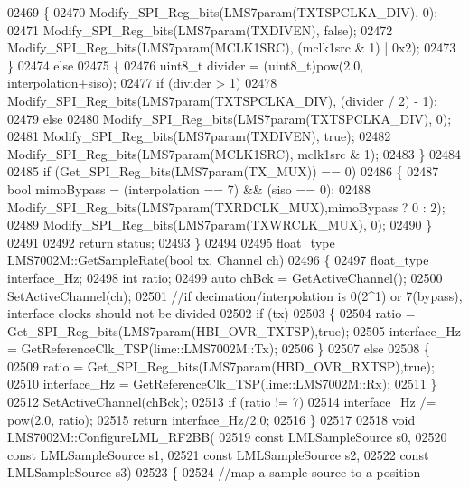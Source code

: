 \begin{DoxyCode}
{{{{{{{{{{{{{{{{{{{{{{{{{{{{{{{{{{{{{{{{{{{{{{{{{{{{{{{{{{{{{{{{02469     \{
02470         Modify_SPI_Reg_bits(LMS7param(TXTSPCLKA_DIV), 0);
02471         Modify_SPI_Reg_bits(LMS7param(TXDIVEN), \textcolor{keyword}{false});
02472         Modify_SPI_Reg_bits(LMS7param(MCLK1SRC), (mclk1src & 1) | 0x2);
02473     \}
02474     \textcolor{keywordflow}{else}
02475     \{
02476         uint8\_t divider = (uint8\_t)pow(2.0, interpolation+siso);
02477         \textcolor{keywordflow}{if} (divider > 1)
02478             Modify_SPI_Reg_bits(LMS7param(TXTSPCLKA_DIV), (divider / 2) - 1);
02479         \textcolor{keywordflow}{else}
02480             Modify_SPI_Reg_bits(LMS7param(TXTSPCLKA_DIV), 0);
02481         Modify_SPI_Reg_bits(LMS7param(TXDIVEN), \textcolor{keyword}{true});
02482         Modify_SPI_Reg_bits(LMS7param(MCLK1SRC), mclk1src & 1);
02483     \}
02484 
02485     \textcolor{keywordflow}{if} (Get_SPI_Reg_bits(LMS7param(TX_MUX)) == 0)
02486     \{
02487         \textcolor{keywordtype}{bool} mimoBypass = (interpolation == 7) && (siso == 0);
02488         Modify_SPI_Reg_bits(LMS7param(TXRDCLK_MUX),mimoBypass ? 0 : 2);
02489         Modify_SPI_Reg_bits(LMS7param(TXWRCLK_MUX), 0);
02490     \}
02491 
02492     \textcolor{keywordflow}{return} status;
02493 \}
02494 
02495 float_type LMS7002M::GetSampleRate(\textcolor{keywordtype}{bool} tx, Channel ch)
02496 \{
02497     float_type interface\_Hz;
02498     \textcolor{keywordtype}{int} ratio;
02499     \textcolor{keyword}{auto} chBck = GetActiveChannel();
02500     SetActiveChannel(ch);
02501     \textcolor{comment}{//if decimation/interpolation is 0(2^1) or 7(bypass), interface clocks should not be divided}
02502     \textcolor{keywordflow}{if} (tx)
02503     \{
02504         ratio = Get_SPI_Reg_bits(LMS7param(HBI_OVR_TXTSP),\textcolor{keyword}{true});
02505         interface\_Hz = GetReferenceClk_TSP(lime::LMS7002M::Tx);
02506     \}
02507     \textcolor{keywordflow}{else}
02508     \{
02509         ratio = Get_SPI_Reg_bits(LMS7param(HBD_OVR_RXTSP),\textcolor{keyword}{true});
02510         interface\_Hz = GetReferenceClk_TSP(lime::LMS7002M::Rx);
02511     \}
02512     SetActiveChannel(chBck);
02513     \textcolor{keywordflow}{if} (ratio != 7)
02514         interface\_Hz /= pow(2.0, ratio);
02515     \textcolor{keywordflow}{return} interface\_Hz/2.0;
02516 \}
02517 
02518 \textcolor{keywordtype}{void} LMS7002M::ConfigureLML_RF2BB(
02519     \textcolor{keyword}{const} LMLSampleSource s0,
02520     \textcolor{keyword}{const} LMLSampleSource s1,
02521     \textcolor{keyword}{const} LMLSampleSource s2,
02522     \textcolor{keyword}{const} LMLSampleSource s3)
02523 \{
02524     \textcolor{comment}{//map a sample source to a position}
}}}}}}}}}}}}}}}}}}}}}}}}}}}}}}}}}}}}}}}}}}}}}}}}}}}}}}}}}}}}}}}}
\end{DoxyCode}
